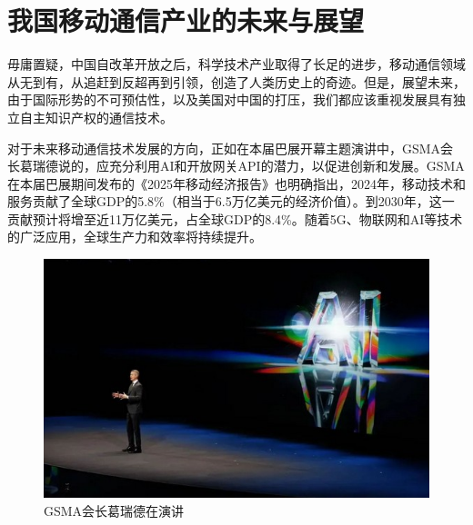 \documentclass{article}
\begin{document}
\section*{我国移动通信产业的未来与展望}
毋庸置疑，中国自改革开放之后，科学技术产业取得了长足的进步，移动通信领域从无到有，从追赶到反超再到引领，创造了人类历史上的奇迹。但是，展望未来，由于国际形势的不可预估性，以及美国对中国的打压，我们都应该重视发展具有独立自主知识产权的通信技术。\par
对于未来移动通信技术发展的方向，正如在本届巴展开幕主题演讲中，GSMA会长葛瑞德说的，应充分利用AI和开放网关API的潜力，以促进创新和发展\cite{news4}。GSMA在本届巴展期间发布的《2025年移动经济报告》也明确指出，2024年，移动技术和服务贡献了全球GDP的5.8\%（相当于6.5万亿美元的经济价值）。到2030年，这一贡献预计将增至近11万亿美元，占全球GDP的8.4\%。随着5G、物联网和AI等技术的广泛应用，全球生产力和效率将持续提升。\par
\begin{figure}[H]
\begin{center}
\includegraphics[scale=0.7]{图4.jpg}
\caption{GSMA会长葛瑞德在演讲}
\end{center}
\end{figure}
\end{document}
